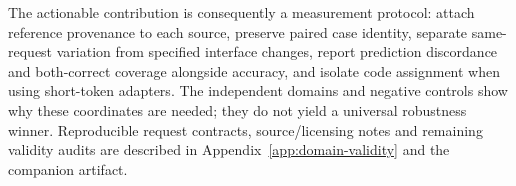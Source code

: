 The actionable contribution is consequently a measurement protocol: attach reference provenance to each source, preserve paired case identity, separate same-request variation from specified interface changes, report prediction discordance and both-correct coverage alongside accuracy, and isolate code assignment when using short-token adapters. The independent domains and negative controls show why these coordinates are needed; they do not yield a universal robustness winner. Reproducible request contracts, source/licensing notes and remaining validity audits are described in Appendix~\ref{app:domain-validity} and the companion artifact.
